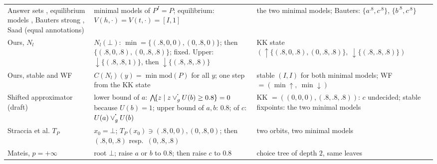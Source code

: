 {\begin{longtable}{@{}p{}p{}p{}@{}}
            Answer sets \cite{BlondeelSVD14,MushthofaSD15,AlvianoP15,LukasiewiczS07}, equilibrium models \cite{SchockaertJV12}, Bauters strong \cite{BautersSDV14tplp}, Saad (equal annotations) & minimal models of $P^I=P$; equilibrium: $V(h,\cdot)=V(t,\cdot)=[I,1]$                                                                                         & the two minimal models; Bauters: $\{a^{.8},c^{.8}\}$, $\{b^{.8},c^{.8}\}$           \\
            Ours, $N_l$                                                                                                                                                                          & $N_l(\bot)$: $\min=\{(.8,0,0),(0,.8,0)\}$; then $\{(.8,0,.8),(0,.8,.8)\}$; fixed. Upper: $\downarrow\!\{(.8,.8,1)\}$, then $\downarrow\!\{(.8,.8,.8)\}$       & KK state $(\uparrow\!\{(.8,0,.8),(0,.8,.8)\},\ \downarrow\!\{(.8,.8,.8)\})$         \\
            Ours, stable and WF                                                                                                                                                                  & $C(N_l)(y)=\min\mathrm{mod}(P)$ for all $y$; one step from the KK state                                                                                       & stable $(I,I)$ for both minimal models; WF $=(\min\!\uparrow,\ \min\!\downarrow)$   \\
            Shifted approximator (draft)                                                                                                                                                         & lower bound of $a$: $\bigglb\{z\mid z\flpcontf{\flpor_g}U(b)\geq0.8\}=0$ because $U(b)=1$; upper bound of $a,b$: $0.8$; of $c$: $U(a)\flpcontf{\flpor_g}U(b)$ & KK $=((0,0,0),(.8,.8,.8))$: $c$ undecided; stable fixpoints: the two minimal models \\
            Straccia et al. $T_P$ \cite{StracciaOD09}                                                                                                                                            & $x_0=\bot$; $T_P(x_0)\ni(.8,0,0),(0,.8,0)$; then $(.8,0,.8)$ resp.\ $(0,.8,.8)$                                                                               & two orbits, two minimal models                                                      \\
            Mateis, $p=+\infty$ \cite{Mateis00}                                                                                                                                                  & root $\bot$; raise $a$ or $b$ to $0.8$; then raise $c$ to $0.8$                                                                                               & choice tree of depth $2$, same leaves                                               \\

\end{longtable}}
